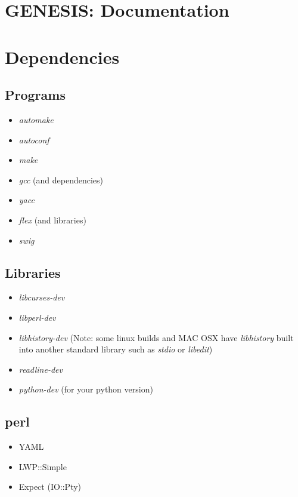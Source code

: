 \documentclass[12pt]{article}
\begin{document}
\section*{GENESIS: Documentation}

\section*{Dependencies}

\subsection*{Programs}

\begin{itemize}
   \item {\it automake}
   \item {\it autoconf}
   \item {\it make}
   \item {\it gcc} (and dependencies)
   \item {\it yacc}
   \item {\it flex} (and libraries)
   \item {\it swig}
\end{itemize} 

\subsection*{Libraries}

\begin{itemize}
   \item {\it libcurses-dev}
   \item {\it libperl-dev}
   \item {\it libhistory-dev} (Note: some linux builds and MAC OSX have {\it libhistory} built into another standard library such as {\it stdio} or {\it libedit})
   \item {\it readline-dev}
   \item {\it python-dev} (for your python version) 
\end{itemize} 

\subsection*{perl}

\begin{itemize}
   \item YAML
   \item LWP::Simple
   \item Expect (IO::Pty)
\end{itemize}
\end{document}
